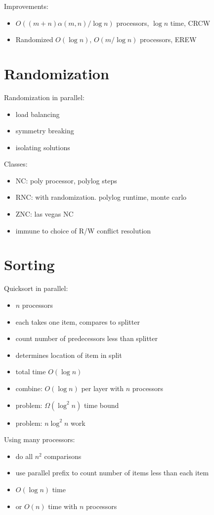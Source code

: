 \documentclass[12pt]{article}
\begin{document}
Improvements:
\begin{itemize}
\item $O((m+n)\alpha(m,n)/\log n)$ processors, $\log n$ time, CRCW
\item Randomized $O(\log n)$, $O(m/\log n)$ processors, EREW
\end{itemize}


\section{Randomization}


Randomization in parallel:
\begin{itemize}
\item load balancing
\item symmetry breaking
\item isolating solutions
\end{itemize}

Classes:
\begin{itemize}
\item NC: poly processor, polylog steps
\item RNC: with randomization.  polylog runtime, monte carlo
\item ZNC: las vegas NC
\item immune to choice of R/W conflict resolution
\end{itemize}

\section*{Sorting}

Quicksort in parallel:
\begin{itemize}
\item $n$ processors
\item each takes one item, compares to splitter
\item count number of predecessors less than splitter
\item determines location of item in split
\item total time $O(\log n)$
\item combine: $O(\log n)$ per layer with $n$ processors
\item problem: $\Omega(\log^2 n)$ time bound
\item problem: $n\log^2 n$ work
\end{itemize}

Using many processors:
\begin{itemize}
\item do all $n^2$ comparisons
\item use parallel prefix to count number of items less than each item
\item $O(\log n)$ time
\item or $O(n)$ time with $n$ processors
\end{itemize}
\end{document}
